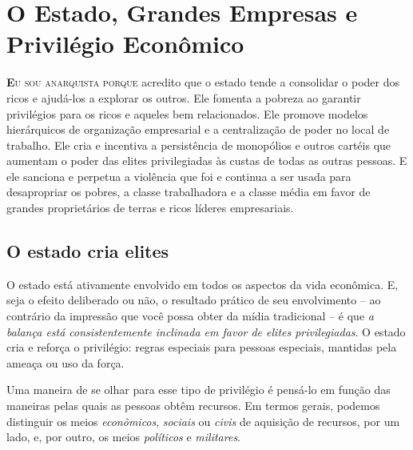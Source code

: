 
\chapter{O Estado, Grandes Empresas e Privilégio Econômico}
\label{chap:3}

\lettrine[lines=2]{\textcolor{LettrineColor}{\textbf{E}}}{u sou anarquista porque} acredito que o estado tende a consolidar o poder dos ricos e ajudá-los a explorar os outros. Ele fomenta a pobreza ao garantir privilégios para os ricos e aqueles bem relacionados. Ele promove modelos hierárquicos de organização empresarial e a centralização de poder no local de trabalho. Ele cria e incentiva a persistência de monopólios e outros cartéis que aumentam o poder das elites privilegiadas às custas de todas as outras pessoas. E ele sanciona e perpetua a violência que foi e continua a ser usada para desapropriar os pobres, a classe trabalhadora e a classe média em favor de grandes proprietários de terras e ricos líderes empresariais.

\section{O estado cria elites}

O estado está ativamente envolvido em todos os aspectos da vida econômica. E, seja o efeito deliberado ou não, o resultado prático de seu envolvimento -- ao contrário da impressão que você possa obter da mídia tradicional -- é que \emph{a balança está consistentemente inclinada em favor de elites privilegiadas}. O estado cria e reforça o privilégio: regras especiais para pessoas especiais, mantidas pela ameaça ou uso da força.

Uma maneira de se olhar para esse tipo de privilégio é pensá-lo em função das maneiras pelas quais as pessoas obtêm recursos. Em termos gerais, podemos distinguir os meios \emph{econômicos}, \emph{sociais} ou \emph{civis} de aquisição de recursos, por um lado, e, por outro, os meios \emph{políticos} e \emph{militares}.

